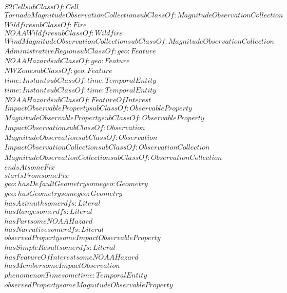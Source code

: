 \begin{align}
  S2Cell subClassOf: Cell\\
  TornadoMagnitudeObservationCollection subClassOf: MagnitudeObservationCollection\\
  Wildfire subClassOf: Fire\\
  NOAAWildfire subClassOf: Wildfire\\
  WindMagnitudeObservationCollection subClassOf: MagnitudeObservationCollection\\
  AdministrativeRegion subClassOf: geo:Feature\\
  NOAAHazard subClassOf: geo:Feature\\
  NWZone subClassOf: geo:Feature\\
  time:Instant subClassOf: time:TemporalEntity\\
  time:Instant subClassOf: time:TemporalEntity\\
  NOAAHazard subClassOf: FeatureOfInterest\\
  ImpactObservableProperty subClassOf: ObservableProperty\\
  MagnitudeObservableProperty subClassOf: ObservableProperty\\
  ImpactObservation subClassOf: Observation\\
  MagnitudeObservation subClassOf: Observation\\
  ImpactObservationCollection subClassOf: ObservationCollection\\
  MagnitudeObservationCollection subClassOf: ObservationCollection\\
  endsAt some Fix \\
  startsFrom some Fix \\
  geo:hasDefaultGeometry some geo:Geometry \\
  geo:hasGeometry some geo:Geometry \\
  hasAzimuth some rdfs:Literal \\
  hasRange some rdfs:Literal \\
  hasPart some NOAAHazard \\
  hasNarrative some rdfs:Literal \\
  observedProperty some ImpactObservableProperty \\
  hasSimpleResult some rdfs:Literal \\
  hasFeatureOfInterest some NOAAHazard \\
  hasMember some ImpactObservation \\
  phenomenonTime some time:TemporalEntity \\
  observedProperty some MagnitudeObservableProperty \\

\end{align}
